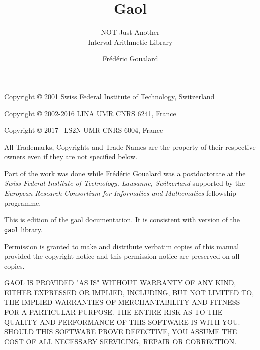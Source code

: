 \documentclass{manual}
\title{Gaol \version}
\subtitle{NOT Just Another \\Interval Arithmetic Library}
\author{Fr\'ed\'eric Goualard}
\institute{Laboratoire d'Informatique de Nantes-Atlantique, France}
\begin{document}
\nobibliography*
\maketitle

\begin{copyrighttxt}
Copyright \copyright{} 2001 Swiss Federal Institute of Technology, Switzerland

Copyright \copyright{} 2002-2016 LINA UMR CNRS 6241, France

Copyright \copyright{} 2017-\number\year\ LS2N UMR CNRS 6004, France

All Trademarks, Copyrights and Trade Names are the property of their respective owners
even if they are not specified below.

Part of the work was done while Fr\'ed\'eric Goualard was a postdoctorate
at the \emph{Swiss Federal Institute of Technology, Lausanne, Switzerland}
supported by the \emph{European Research Consortium for Informatics and
Mathematics} fellowship programme.

This is edition \edition{} of the gaol documentation.
It is consistent with version \version{} of the \texttt{gaol} library.

Permission is granted to make and distribute verbatim copies of this manual
provided the copyright notice and this permission notice are preserved on all
copies.

\smallskip
GAOL IS PROVIDED "AS IS" WITHOUT WARRANTY OF ANY
KIND, EITHER EXPRESSED OR IMPLIED, INCLUDING, BUT NOT LIMITED TO, THE
IMPLIED WARRANTIES OF MERCHAN\-TA\-BILITY AND FITNESS FOR A PARTICULAR
PURPOSE.  THE ENTIRE RISK AS TO THE QUALITY AND PERFORMANCE OF THIS
SOFTWARE IS WITH YOU.  SHOULD THIS SOFTWARE PRO\-VE DEFECTIVE, YOU ASSUME
THE COST OF ALL NECESSARY SERVICING, REPAIR OR CORRECTION.
\end{copyrighttxt}

\newpage
\thispagestyle{empty}

\vspace*{7cm}
\end{document}
